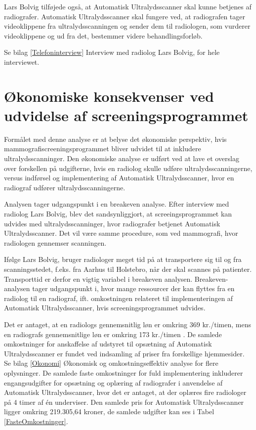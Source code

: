 Lars Bolvig tilføjede også, at Automatisk Ultralydsscanner skal kunne betjenes af radiografer. Automatisk Ultralydsscanner skal fungere ved, at radiografen tager videoklippene fra ultralydsscanningen og sender dem til radiologen, som vurderer videoklippene og ud fra det, bestemmer videre behandlingsforløb.

Se bilag \ref{Telefoninterview} Interview med radiolog Lars Bolvig, for hele interviewet. 

\section{Økonomiske konsekvenser ved udvidelse af screeningsprogrammet} 
Formålet med denne analyse er at belyse det økonomiske perspektiv, hvis mammografiscreeningsprogrammet bliver udvidet til at inkludere ultralydsscanninger. Den økonomiske analyse er udført ved at lave et overslag over forskellen på udgifterne, hvis en radiolog skulle udføre ultralydsscanningerne, versus indførsel og implementering af Automatisk Ultralydsscanner, hvor en radiograf udfører ultralydsscanningerne. 

Analysen tager udgangspunkt i en breakeven analyse.  Efter interview med radiolog Lars Bolvig, blev det sandsynliggjort, at screeingsprogrammet kan udvides med ultralydsscanninger, hvor radiografer betjenet Automatisk Ultralydsscanner. Det vil være samme procedure, som ved mammografi, hvor radiologen gennemser scanningen. 

Ifølge Lars Bolvig, bruger radiologer meget tid på at transportere sig til og fra scanningsstedet, f.eks. fra Aarhus til Holstebro, når der skal scannes på patienter.  Transporttid er derfor en vigtig variabel i breakeven analysen. Breakeven-analysen tager udgangspunkt i, hvor mange ressourcer der kan flyttes fra en radiolog til en radiograf, ift. omkostningen relateret til implementeringen af Automatisk Ultralydsscanner, hvis screeningsprogrammet udvides.  

Det er antaget, at en radiologs gennemsnitlig løn er omkring 369 kr./timen, mens en radiografs gennemsnitlige løn er omkring 173 kr./timen \cite{Lon}. De samlede omkostninger for anskaffelse af udstyret til opsætning af Automatisk Ultralydsscanner er fundet ved indsamling af priser fra forskellige hjemmesider. Se bilag \ref{Okonomi} Økonomisk og omkostningseffektiv analyse for flere oplysninger. De samlede faste omkostninger for fuld implementering inkluderer engangsudgifter for opsætning og oplæring af radiografer i anvendelse af Automatisk Ultralydsscanner, hvor det er antaget, at der oplæres fire radiologer på 4 timer af én underviser.  Den samlede pris for Automatisk Ultralydsscanner ligger omkring 219.305,64 kroner, de samlede udgifter kan ses i Tabel \ref{FasteOmkostninger}. 

